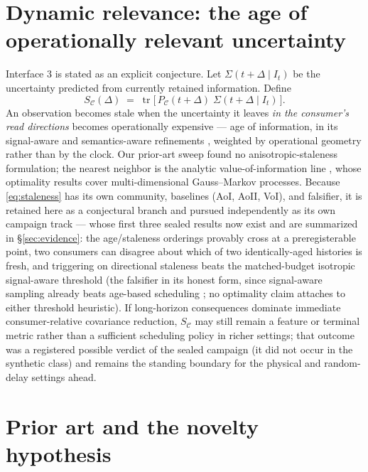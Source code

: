 \documentclass{article}
\theoremstyle{definition}
\theoremstyle{remark}
\newcommand{\PC}{P_{\mathcal{C}}}
\newcommand{\tr}{\operatorname{tr}}
\newcommand{\Sig}{\Sigma}
\newcommand{\SC}{S_{\mathcal{C}}}
\begin{document}
\section{Dynamic relevance: the age of operationally relevant uncertainty}
\label{sec:staleness}

Interface 3 is stated as an explicit conjecture. Let $\Sig(t{+}\Delta\mid
I_t)$ be the uncertainty predicted from currently retained information.
Define
\begin{equation}
\label{eq:staleness}
\SC(\Delta)\;=\;\tr\!\big[\,\PC(t{+}\Delta)\;\Sig(t{+}\Delta\mid I_t)\,\big].
\end{equation}
An observation becomes stale when the uncertainty it leaves \emph{in the
consumer's read directions} becomes operationally expensive --- age of
information, in its signal-aware and semantics-aware refinements
\citep{sun2020,maatouk2022}, weighted by operational geometry
rather than by the clock. Our prior-art sweep found no anisotropic-staleness
formulation; the nearest neighbor is the analytic value-of-information
line \citep{soleymani2022}, whose optimality results cover
multi-dimensional Gauss--Markov processes. Because \eqref{eq:staleness}
has its own community, baselines (AoI, AoII, VoI), and falsifier, it is
retained here as a conjectural branch and pursued independently as its
own campaign track --- whose first three sealed results now exist and
are summarized in \S\ref{sec:evidence}: the age/staleness orderings
provably cross at a preregisterable point, two consumers can disagree
about which of two identically-aged histories is fresh, and triggering
on directional staleness beats the matched-budget isotropic
signal-aware threshold (the falsifier in its honest form, since
signal-aware sampling already beats age-based scheduling
\citep{sun2020}; no optimality claim attaches to either threshold
heuristic). If long-horizon consequences dominate immediate
consumer-relative covariance reduction, $\SC$ may still remain a feature
or terminal metric rather than a sufficient scheduling policy in richer
settings; that outcome was a registered possible verdict of the sealed
campaign (it did not occur in the synthetic class) and remains the
standing boundary for the physical and random-delay settings ahead.

\section{Prior art and the novelty hypothesis}
\label{sec:priorart}
\end{document}

